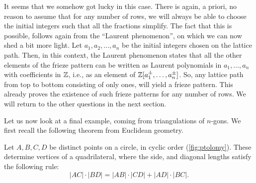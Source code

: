 \documentclass{article}
\begin{document}
It seems that we somehow got lucky in this case. There is again, a priori, no reason to
assume that for any number of rows, we will always be able to choose the initial
integers such that all the fractions simplify. The fact that this is possible, follows
again from the ``Laurent phenomenon'', on which we can now
shed a bit more light. Let $a_1, a_2, \dots, a_n$ be the initial integers chosen on the
lattice path. Then, in this context, the Laurent phenomenon states that all the other
elements of the frieze pattern can be written as Laurent
polynomials in $a_1 , \dots, a_n$ with coefficients in
$\mathbb{Z}$, i.e., as an element of $\mathbb{Z} [a_1 ^\pm, \dots, a_n^\pm]$. So, any lattice path
from top to bottom consisting of only ones, will yield a frieze pattern. This already
proves the existence of such frieze patterns for any number of rows. We will return to
the other questions in the next section.

Let us now look at a final example, coming from triangulations of $n$-gons. We first
recall the following theorem from Euclidean geometry.
\begin{theorem}
	Let $A,B,C,D$ be distinct points on a circle, in cyclic order (\cref{fig:ptolomy}).
	These determine vertices of a quadrilateral, where the side, and diagonal lengths
	satisfy the following rule:
	\begin{equation*}
		|AC| \cdot |BD| = |AB|\cdot |CD| + |AD| \cdot |BC|.
	\end{equation*}
\end{theorem}
\end{document}
